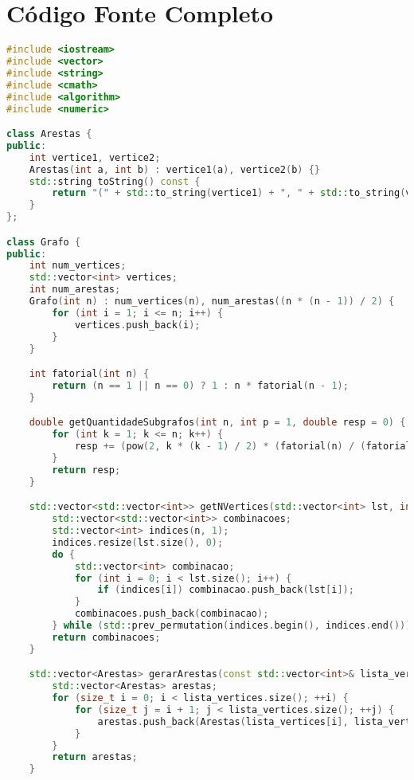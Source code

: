 \documentclass{article}
\begin{document}
\section{Código Fonte Completo}
\begin{lstlisting}[language=C++, basicstyle=\ttfamily\small, breaklines=true, keywordstyle=\color{blue}]
#include <iostream>
#include <vector>
#include <string>
#include <cmath>
#include <algorithm>
#include <numeric>

class Arestas {
public:
    int vertice1, vertice2;
    Arestas(int a, int b) : vertice1(a), vertice2(b) {}
    std::string toString() const {
        return "(" + std::to_string(vertice1) + ", " + std::to_string(vertice2) + ")";
    }
};

class Grafo {
public:
    int num_vertices;
    std::vector<int> vertices;
    int num_arestas;
    Grafo(int n) : num_vertices(n), num_arestas((n * (n - 1)) / 2) {
        for (int i = 1; i <= n; i++) {
            vertices.push_back(i);
        }
    }

    int fatorial(int n) {
        return (n == 1 || n == 0) ? 1 : n * fatorial(n - 1);
    }

    double getQuantidadeSubgrafos(int n, int p = 1, double resp = 0) {
        for (int k = 1; k <= n; k++) {
            resp += (pow(2, k * (k - 1) / 2) * (fatorial(n) / (fatorial(k) * fatorial(n - k))));
        }
        return resp;
    }

    std::vector<std::vector<int>> getNVertices(std::vector<int> lst, int n) {
        std::vector<std::vector<int>> combinacoes;
        std::vector<int> indices(n, 1);
        indices.resize(lst.size(), 0);
        do {
            std::vector<int> combinacao;
            for (int i = 0; i < lst.size(); i++) {
                if (indices[i]) combinacao.push_back(lst[i]);
            }
            combinacoes.push_back(combinacao);
        } while (std::prev_permutation(indices.begin(), indices.end()));
        return combinacoes;
    }

    std::vector<Arestas> gerarArestas(const std::vector<int>& lista_vertices) {
        std::vector<Arestas> arestas;
        for (size_t i = 0; i < lista_vertices.size(); ++i) {
            for (size_t j = i + 1; j < lista_vertices.size(); ++j) {
                arestas.push_back(Arestas(lista_vertices[i], lista_vertices[j]));
            }
        }
        return arestas;
    }


\end{lstlisting}
\end{document}
